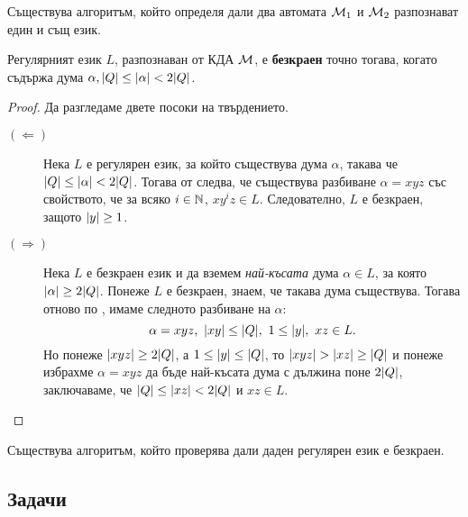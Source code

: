 \begin{cor}
  Съществува алгоритъм, който определя дали два автомата $\mathcal{M}_1$ и $\mathcal{M}_2$ разпознават един и същ език.
\end{cor}

\begin{prop}
  Регулярният език $L$, 
  разпознаван от КДА $\mathcal{M}$, е {\bf безкраен} точно тогава, когато съдържа дума $\alpha, \lvert{Q}\rvert \leq \lvert{\alpha}\rvert < 2\lvert{Q}\rvert$.
\end{prop}
\begin{proof}
  Да разгледаме двете посоки на твърдението.
  \begin{description}
  \item[$(\Leftarrow)$]
    Нека $L$ е регулярен език, за който съществува дума $\alpha$, такава че $\lvert{Q}\rvert \leq \lvert{\alpha}\rvert < 2\lvert{Q}\rvert$.
    Тогава от  следва, че съществува разбиване $\alpha = xyz$ със свойството, че
    за всяко $i \in \mathbb{N}$, $xy^iz \in L$. Следователно, $L$ е безкраен, защото $\lvert{y}\rvert \geq 1$.
  \item[$(\Rightarrow)$]
    Нека $L$ е безкраен език и %
    да вземем {\em най-късата} дума $\alpha \in L$, за която $\lvert{\alpha}\rvert \geq 2\lvert{Q}\rvert$.
    Понеже $L$ е безкраен, знаем, че такава дума съществува.
    Тогава отново по , имаме следното разбиване на $\alpha$:
    \[\alpha = xyz,\ \abs{xy} \leq \abs{Q},\ 1\leq \abs{y},\ xz \in L.\]
    Но понеже $\lvert{xyz}\rvert \geq 2\lvert{Q}\rvert$, а $1 \leq \lvert{y}\rvert \leq \lvert{Q}\rvert$, то $\lvert{xyz}\rvert > \lvert{xz}\rvert \geq \lvert{Q}\rvert$ и понеже избрахме $\alpha = xyz$
    да бъде най-късата дума с дължина поне $2\lvert{Q}\rvert$, заключаваме, че $\lvert{Q}\rvert \leq \lvert{xz}\rvert < 2\lvert{Q}\rvert$ и $xz \in L$.
  \end{description}
\end{proof}

\begin{cor}
  Съществува алгоритъм, който проверява дали даден регулярен език е безкраен.
\end{cor}

\subsection{Задачи}

